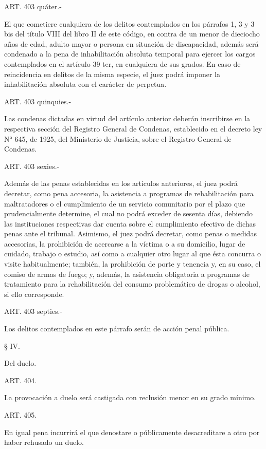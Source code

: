     ART. 403 quáter.-

    El que cometiere cualquiera de los delitos contemplados en los párrafos 1, 3 y 3 bis del título VIII del libro II de este código, en contra de un menor de dieciocho años de edad, adulto mayor o persona en situación de discapacidad, además será condenado a la pena de inhabilitación absoluta temporal para ejercer los cargos contemplados en el artículo 39 ter, en cualquiera de sus grados. En caso de reincidencia en delitos de la misma especie, el juez podrá imponer la inhabilitación absoluta con el carácter de perpetua.

    ART. 403 quinquies.-

    Las condenas dictadas en virtud del artículo anterior deberán inscribirse en la respectiva sección del Registro General de Condenas, establecido en el decreto ley N° 645, de 1925, del Ministerio de Justicia, sobre el Registro General de Condenas.

    ART. 403 sexies.-

    Además de las penas establecidas en los artículos anteriores, el juez podrá decretar, como pena accesoria, la asistencia a programas de rehabilitación para maltratadores o el cumplimiento de un servicio comunitario por el plazo que prudencialmente determine, el cual no podrá exceder de sesenta días, debiendo las instituciones respectivas dar cuenta sobre el cumplimiento efectivo de dichas penas ante el tribunal.
    Asimismo, el juez podrá decretar, como penas o medidas accesorias, la prohibición de acercarse a la víctima o a su domicilio, lugar de cuidado, trabajo o estudio, así como a cualquier otro lugar al que ésta concurra o visite habitualmente; también, la prohibición de porte y tenencia y, en su caso, el comiso de armas de fuego; y, además, la asistencia obligatoria a programas de tratamiento para la rehabilitación del consumo problemático de drogas o alcohol, si ello corresponde.

    ART. 403 septies.-

    Los delitos contemplados en este párrafo serán de acción penal pública.


    § IV.

    Del duelo.


    ART. 404.

    La provocación a duelo será castigada con reclusión menor en su grado mínimo.



    ART. 405.

    En igual pena incurrirá el que denostare o públicamente desacreditare a otro por haber rehusado un duelo.


